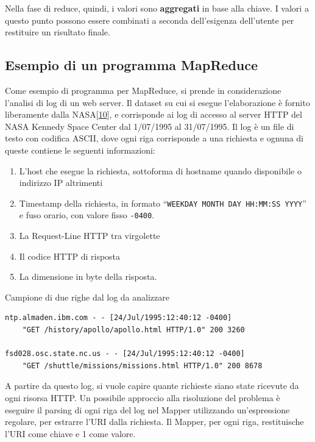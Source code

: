 \documentclass[italian,a4paper, twoside, 12pt]{report}
\providecommand{\tightlist}{%
  \setlength{\itemsep}{0pt}\setlength{\parskip}{0pt}}
\begin{document}
Nella fase di reduce, quindi, i valori sono \textbf{aggregati} in base
alla chiave. I valori a questo punto possono essere combinati a seconda
dell'esigenza dell'utente per restituire un risultato finale.

\subsection{Esempio di un programma
MapReduce}\label{esempio-di-un-programma-mapreduce}

Come esempio di programma per MapReduce, si prende in considerazione
l'analisi di log di un web server. Il dataset su cui si esegue
l'elaborazione è fornito liberamente dalla
NASA{[}\protect\hyperlink{ref-nasa-weblog}{10}{]}, e corrisponde ai log
di accesso al server HTTP del NASA Kennedy Space Center dal 1/07/1995 al
31/07/1995. Il log è un file di testo con codifica ASCII, dove ogni riga
corrisponde a una richiesta e ognuna di queste contiene le seguenti
informazioni:

\begin{enumerate}
\tightlist
\item
  L'host che esegue la richiesta, sottoforma di hostname quando
  disponibile o indirizzo IP altrimenti
\item
  Timestamp della richiesta, in formato
  ``\texttt{WEEKDAY\ MONTH\ DAY\ HH:MM:SS\ YYYY}'' e fuso orario, con
  valore fisso \texttt{-0400}.
\item
  La Request-Line HTTP tra virgolette
\item
  Il codice HTTP di risposta
\item
  La dimensione in byte della risposta.
\end{enumerate}

\begin{codelisting}

\caption{Campione di due righe dal log da analizzare}

\hypertarget{lst:log-sample}{\label{lst:log-sample}}
\begin{verbatim}
ntp.almaden.ibm.com - - [24/Jul/1995:12:40:12 -0400] 
    "GET /history/apollo/apollo.html HTTP/1.0" 200 3260

fsd028.osc.state.nc.us - - [24/Jul/1995:12:40:12 -0400]
    "GET /shuttle/missions/missions.html HTTP/1.0" 200 8678
\end{verbatim}

\end{codelisting}

A partire da questo log, si vuole capire quante richieste siano state
ricevute da ogni risorsa HTTP. Un possibile approccio alla risoluzione
del problema è eseguire il parsing di ogni riga del log nel Mapper
utilizzando un'espressione regolare, per estrarre l'URI dalla richiesta.
Il Mapper, per ogni riga, restituische l'URI come chiave e 1 come
valore.
\end{document}
